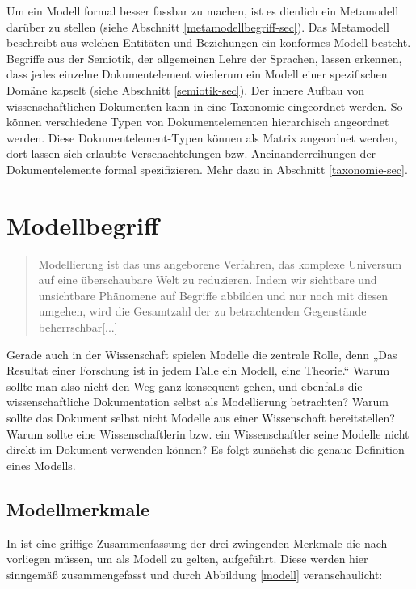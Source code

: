  
Um ein Modell formal besser fassbar zu machen, ist es dienlich ein Metamodell darüber zu stellen (siehe Abschnitt \ref{metamodellbegriff-sec}). Das Metamodell beschreibt aus welchen Entitäten und Beziehungen ein konformes Modell besteht. Begriffe aus der Semiotik, der allgemeinen Lehre der Sprachen, lassen erkennen, dass jedes einzelne Dokumentelement wiederum ein Modell einer spezifischen Domäne kapselt (siehe Abschnitt \ref{semiotik-sec}). Der innere Aufbau von wissenschaftlichen Dokumenten kann in eine Taxonomie eingeordnet werden. So können verschiedene Typen von Dokumentelementen hierarchisch angeordnet werden. Diese Dokumentelement-Typen können als Matrix angeordnet werden, dort lassen sich erlaubte Verschachtelungen bzw. Aneinanderreihungen der Dokumentelemente formal spezifizieren. Mehr dazu in Abschnitt \ref{taxonomie-sec}.

 
\section{Modellbegriff}\label{modellbegriff-sec}
 
\begin{quote}
 Modellierung ist das uns angeborene Verfahren, das komplexe Universum auf eine überschaubare Welt zu reduzieren. Indem wir sichtbare und unsichtbare Phänomene auf Begriffe abbilden und nur noch mit diesen umgehen, wird die Gesamtzahl der zu betrachtenden Gegenstände beherrschbar[...] \citep[S.~7]{Ludewig}
\end{quote}
 
Gerade auch in der Wissenschaft spielen Modelle die zentrale Rolle, denn „Das Resultat einer Forschung ist in jedem Falle ein Modell, eine Theorie.“ \citep[S.~8]{Ludewig} Warum sollte man also nicht den Weg ganz konsequent gehen, und ebenfalls die wissenschaftliche Dokumentation selbst als Modellierung betrachten? Warum sollte das Dokument selbst nicht Modelle aus einer Wissenschaft bereitstellen? Warum sollte eine Wissenschaftlerin bzw. ein Wissenschaftler seine Modelle nicht direkt im Dokument verwenden können? Es folgt zunächst die genaue Definition eines Modells.

 
\subsection{Modellmerkmale}\label{modellmerkmale}
 
In \citep[S.~9]{Ludewig} ist eine griffige Zusammenfassung der drei zwingenden Merkmale die nach \citep{Stachowiak} vorliegen müssen, um als Modell zu gelten, aufgeführt. Diese werden hier sinngemäß zusammengefasst und durch Abbildung \ref{modell} veranschaulicht:

